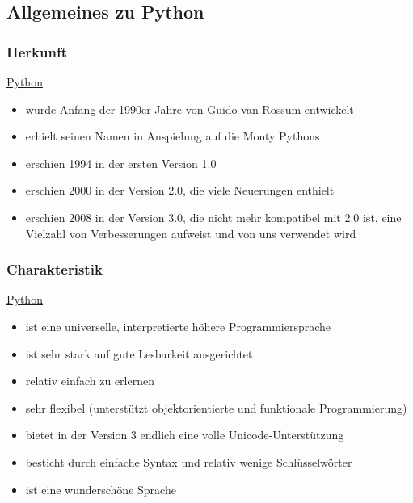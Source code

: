 
\subsection{\texorpdfstring{{Allgemeines zu
Python}}{Allgemeines zu Python}}

\subsubsection{\texorpdfstring{{Herkunft}}{Herkunft}}

\href{http://python.org}{Python}

\begin{itemize}
\itemsep1pt\parskip0pt
\item
  {wurde Anfang der 1990er Jahre von Guido van Rossum entwickelt}
\item
  {erhielt seinen Namen in Anspielung auf die Monty Pythons}
\item
  {erschien 1994 in der ersten Version 1.0}
\item
  {erschien 2000 in der Version 2.0, die viele Neuerungen enthielt}
\item
  {erschien 2008 in der Version 3.0, die nicht mehr kompatibel mit 2.0
  ist, eine Vielzahl von Verbesserungen aufweist und von uns verwendet
  wird}
\end{itemize}


\subsubsection{\texorpdfstring{{Charakteristik}}{Charakteristik}}

\href{http://python.org}{Python}

\begin{itemize}
\itemsep1pt\parskip0pt
\item
  {ist eine universelle, interpretierte höhere Programmiersprache}
\item
  {ist sehr stark auf gute Lesbarkeit ausgerichtet}
\item
  {relativ einfach zu erlernen}
\item
  {sehr flexibel (unterstützt objektorientierte und funktionale
  Programmierung)}
\item
  {bietet in der Version 3 endlich eine volle Unicode-Unterstützung}
\item
  {besticht durch einfache Syntax und relativ wenige Schlüsselwörter}
\item
  {ist eine wunderschöne Sprache}
\end{itemize}


